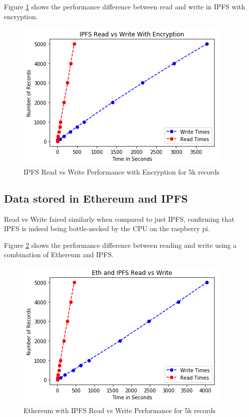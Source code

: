 \documentclass[11pt,openright]{report}
\begin{document}
Figure \ref{fig:graph_ipfs_readvwrite_wencr} shows the performance difference between read and write in IPFS with encryption.
\begin{figure}
    \centering
    \includegraphics[scale=1]{results/graphs/IPFS_Read_v_Write_Encr.png}
    \caption{IPFS Read vs Write Performance with Encryption for 5k records}
    \label{fig:graph_ipfs_readvwrite_wencr}
\end{figure}

\subsection{Data stored in Ethereum and IPFS}
Read vs Write faired similarly when compared to just IPFS, confirming that IPFS is indeed being bottle-necked by the CPU on the raspberry pi.

Figure \ref{fig:graph_eth_ipfs_readvwrite} shows the performance difference between reading and write using a combination of Ethereum and IPFS.

\begin{figure}
    \centering
    \includegraphics[scale=1]{results/graphs/Eth_IPFS_Read_v_Write.png}
    \caption{Ethereum with IPFS Read vs Write Performance for 5k records}
    \label{fig:graph_eth_ipfs_readvwrite}
\end{figure}
\end{document}
